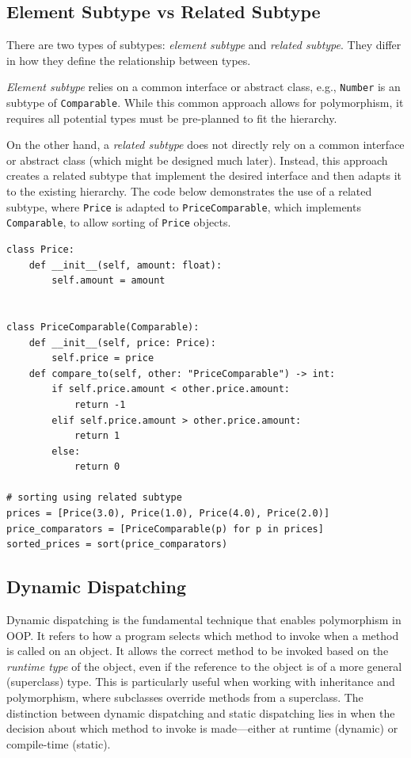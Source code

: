 \documentclass[oneside,11pt,dvipsnames]{book}
\newcommand{\code}[1]{\texttt{#1}}
\begin{document}
\subsection{Element Subtype vs Related Subtype} There are two types of subtypes: \emph{element subtype} and \emph{related subtype}. They differ in how they define the relationship between types.

\emph{Element subtype} relies on a common interface or abstract class, e.g., \code{Number} is an  subtype of \code{Comparable}. While this common approach allows for polymorphism, it requires all potential types must be pre-planned to fit the hierarchy. 

On the other hand, a \emph{related subtype} does not directly rely on a common interface or abstract class (which might be designed much later). Instead, this approach creates a related subtype that implement the desired interface and then adapts it to the existing hierarchy. The code below demonstrates the use of a related subtype, where \code{Price} is adapted to \code{PriceComparable}, which implements \code{Comparable}, to allow sorting of \code{Price} objects.

\begin{lstlisting}
class Price:
    def __init__(self, amount: float):
        self.amount = amount


class PriceComparable(Comparable):
    def __init__(self, price: Price):
        self.price = price
    def compare_to(self, other: "PriceComparable") -> int:
        if self.price.amount < other.price.amount:
            return -1
        elif self.price.amount > other.price.amount:
            return 1
        else:
            return 0

# sorting using related subtype            
prices = [Price(3.0), Price(1.0), Price(4.0), Price(2.0)]
price_comparators = [PriceComparable(p) for p in prices]
sorted_prices = sort(price_comparators)
\end{lstlisting}

\subsection{Dynamic Dispatching}\label{sec:dynamic-dispatching}

Dynamic dispatching is the fundamental technique that enables polymorphism in OOP. It refers to how a program selects which method to invoke when a method is called on an object.  It allows the correct method to be invoked based on the \emph{runtime type} of the object, even if the reference to the object is of a more general (superclass) type. This is particularly useful when working with inheritance and polymorphism, where subclasses override methods from a superclass.
The distinction between dynamic dispatching and static dispatching lies in when the decision about which method to invoke is made—either at runtime (dynamic) or compile-time (static).
\end{document}
